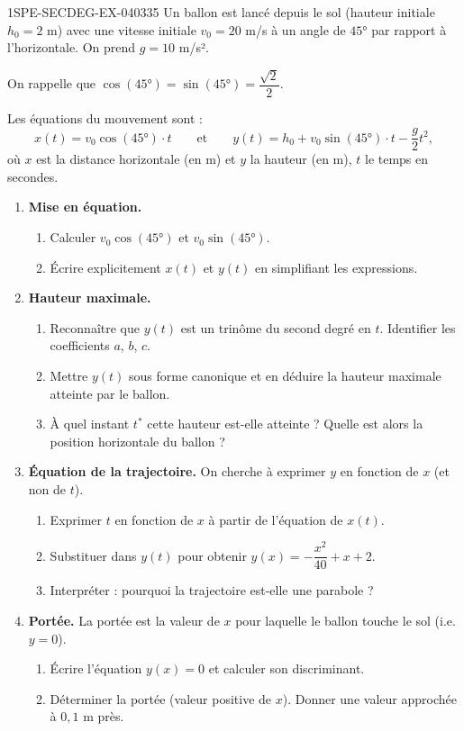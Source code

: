 \begin{exercice}{1SPE-SECDEG-EX-040}{3}{35}
Un ballon est lancé depuis le sol (hauteur initiale $h_0 = 2$ m) avec une vitesse initiale $v_0 = 20$ m/s à un angle de $45°$ par rapport à l'horizontale. On prend $g = 10$ m/s².

On rappelle que $\cos(45°) = \sin(45°) = \dfrac{\sqrt{2}}{2}$.

Les équations du mouvement sont :
\[
  x(t) = v_0 \cos(45°) \cdot t \qquad \text{et} \qquad y(t) = h_0 + v_0 \sin(45°) \cdot t - \frac{g}{2}t^2,
\]
où $x$ est la distance horizontale (en m) et $y$ la hauteur (en m), $t$ le temps en secondes.

\begin{enumerate}
  \item \textbf{Mise en équation.}
  \begin{enumerate}
    \item Calculer $v_0 \cos(45°)$ et $v_0 \sin(45°)$.
    \item Écrire explicitement $x(t)$ et $y(t)$ en simplifiant les expressions.
  \end{enumerate}

  \item \textbf{Hauteur maximale.}
  \begin{enumerate}
    \item Reconnaître que $y(t)$ est un trinôme du second degré en $t$. Identifier les coefficients $a$, $b$, $c$.
    \item Mettre $y(t)$ sous forme canonique et en déduire la hauteur maximale atteinte par le ballon.
    \item À quel instant $t^*$ cette hauteur est-elle atteinte ? Quelle est alors la position horizontale du ballon ?
  \end{enumerate}

  \item \textbf{Équation de la trajectoire.} On cherche à exprimer $y$ en fonction de $x$ (et non de $t$).
  \begin{enumerate}
    \item Exprimer $t$ en fonction de $x$ à partir de l'équation de $x(t)$.
    \item Substituer dans $y(t)$ pour obtenir $y(x) = -\dfrac{x^2}{40} + x + 2$.
    \item Interpréter : pourquoi la trajectoire est-elle une parabole ?
  \end{enumerate}

  \item \textbf{Portée.} La portée est la valeur de $x$ pour laquelle le ballon touche le sol (i.e. $y = 0$).
  \begin{enumerate}
    \item Écrire l'équation $y(x) = 0$ et calculer son discriminant.
    \item Déterminer la portée (valeur positive de $x$). Donner une valeur approchée à $0{,}1$ m près.
  \end{enumerate}


\end{enumerate}
\end{exercice}
